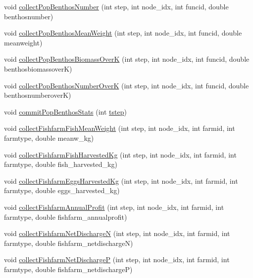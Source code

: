 \begin{DoxyCompactItemize}
void \mbox{\hyperlink{class_displace_model_ac947f00a7e993adac96922a055f92b0e}{collect\+Pop\+Benthos\+Number}} (int step, int node\+\_\+idx, int funcid, double benthosnumber)
\item 
void \mbox{\hyperlink{class_displace_model_a209567affd6b0aa328db50f71bbb6abc}{collect\+Pop\+Benthos\+Mean\+Weight}} (int step, int node\+\_\+idx, int funcid, double meanweight)
\item 
void \mbox{\hyperlink{class_displace_model_a926bcad2019c03271853082fab2b79cf}{collect\+Pop\+Benthos\+Biomass\+OverK}} (int step, int node\+\_\+idx, int funcid, double benthosbiomassoverK)
\item 
void \mbox{\hyperlink{class_displace_model_aeaacbc007427699580847ed2286e8519}{collect\+Pop\+Benthos\+Number\+OverK}} (int step, int node\+\_\+idx, int funcid, double benthosnumberoverK)
\item 
void \mbox{\hyperlink{class_displace_model_a3dc26272a346940e31a8c6ca73fc837d}{commit\+Pop\+Benthos\+Stats}} (int \mbox{\hyperlink{thread__vessels_8cpp_a84bc73d278de929ec9974e1a95d9b23a}{tstep}})
\item 
void \mbox{\hyperlink{class_displace_model_a0c5606d571f92802cf8ef5c4409d880a}{collect\+Fishfarm\+Fish\+Mean\+Weight}} (int step, int node\+\_\+idx, int farmid, int farmtype, double meanw\+\_\+kg)
\item 
void \mbox{\hyperlink{class_displace_model_a16b00f7ba8dd52fc7873c162685607d8}{collect\+Fishfarm\+Fish\+Harvested\+Kg}} (int step, int node\+\_\+idx, int farmid, int farmtype, double fish\+\_\+harvested\+\_\+kg)
\item 
void \mbox{\hyperlink{class_displace_model_a12d32cb287eead6937463ca3ce6370a9}{collect\+Fishfarm\+Eggs\+Harvested\+Kg}} (int step, int node\+\_\+idx, int farmid, int farmtype, double eggs\+\_\+harvested\+\_\+kg)
\item 
void \mbox{\hyperlink{class_displace_model_a88449a36ca6d124e5116e59ec3ea0786}{collect\+Fishfarm\+Annual\+Profit}} (int step, int node\+\_\+idx, int farmid, int farmtype, double fishfarm\+\_\+annualprofit)
\item 
void \mbox{\hyperlink{class_displace_model_af8c23edc1833530f18f9fa1d478d5ac4}{collect\+Fishfarm\+Net\+DischargeN}} (int step, int node\+\_\+idx, int farmid, int farmtype, double fishfarm\+\_\+netdischargeN)
\item 
void \mbox{\hyperlink{class_displace_model_ac95b7bf29d5deb8f1c1870b2de735a5e}{collect\+Fishfarm\+Net\+DischargeP}} (int step, int node\+\_\+idx, int farmid, int farmtype, double fishfarm\+\_\+netdischargeP)

\end{DoxyCompactItemize}
